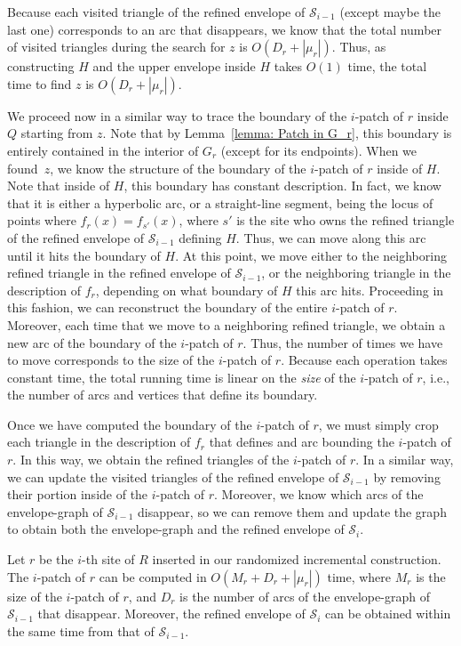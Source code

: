 \documentclass[a4paper,UKenglish]{socg-lipics-v2018}
\newcommand{\icell}[1][i]{${#1}$-patch\xspace}
\newcommand{\s}{\mathcal S}
\begin{document}
Because each visited triangle of the refined envelope of $\s_{i-1}$ (except maybe the last one) corresponds to an arc that disappears, we know that the total number of visited triangles during the search for $z$ is $O(D_r + |\mu_r|)$.
Thus, as constructing $H$ and the upper envelope inside $H$ takes $O(1)$ time, the total time to find $z$ is $O(D_r + |\mu_r|)$.

We proceed now in a similar way to trace the boundary of the \icell of $r$ inside $Q$ starting from $z$.
Note that by Lemma~\ref{lemma: Patch in G_r}, this boundary is entirely contained in the interior of $G_r$ (except for its endpoints). 
When we found~$z$, we know the structure of the boundary of the \icell of $r$ inside of $H$. 
Note that inside of $H$, this boundary has constant description. 
In fact, we know that it is either a hyperbolic arc, or a straight-line segment, being the locus of points where $f_r(x) = f_{s'}(x)$, where $s'$ is the site who owns the refined triangle of the refined envelope of $\s_{i-1}$ defining $H$.
Thus, we can move along this arc until it hits the boundary of $H$. 
At this point, we move either to the neighboring refined triangle in the refined envelope of $\s_{i-1}$, 
or the neighboring triangle in the description of $f_r$,  
depending on what boundary of $H$ this arc hits. 
Proceeding in this fashion, we can reconstruct the boundary of the entire \icell of $r$. 
Moreover, each time that we move to a neighboring refined triangle, we obtain a new arc of the boundary of the \icell of $r$. 
Thus, the number of times we have to move corresponds to the size of the \icell of $r$. 
Because each operation takes constant time, the total running time is linear on the \emph{size} of the \icell of $r$, i.e., the number of arcs and vertices that define its boundary.

Once we have computed the boundary of the \icell of $r$, we must simply crop each triangle in the description of $f_r$ that defines and arc bounding the \icell of $r$. 
In this way, we obtain the refined triangles of the \icell of $r$.
In a similar way, we can update the visited triangles of the refined envelope of $\s_{i-1}$ by removing their portion inside of the \icell of $r$.
Moreover, we know which arcs of the envelope-graph of $\s_{i-1}$ disappear, so we can remove them and update the graph to obtain both the envelope-graph and the refined envelope of $\s_i$. 


\begin{lemma}\label{lemma:Time to insert one site of R}
Let $r$ be the $i$-th site of $R$ inserted in our randomized incremental construction. 
The \icell of $r$ can be computed in $O(M_r + D_r + |\mu_r|)$ time, where $M_r$ is the size of the \icell of $r$, and $D_r$ is the number of arcs of the envelope-graph of $\s_{i-1}$ that disappear.
Moreover, the refined envelope of $\s_i$ can be obtained within the same time from that of $\s_{i-1}$.
\end{lemma}
\end{document}
